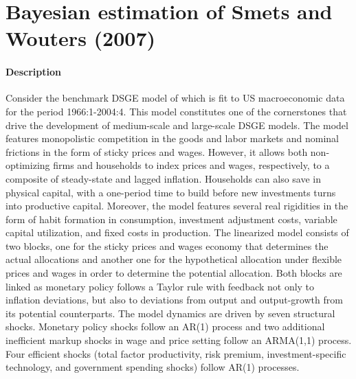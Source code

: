 \documentclass{article}
\begin{document}
\newpage 

\section[Bayesian estimation of Smets and Wouters (2007)]{Bayesian estimation of Smets and Wouters (2007)\label{ex:SW2007RWMH}}
\paragraph{Description}
Consider the benchmark DSGE model of \textcite{Smets.Wouters_2007_ShocksFrictionsUS} which is fit to US macroeconomic data for the period 1966:1-2004:4.
This model constitutes one of the cornerstones that drive the development of medium-scale and large-scale DSGE models.
The model features monopolistic competition in the goods and labor markets and nominal frictions in the form of sticky prices and wages.
However, it allows both non-optimizing firms and households to index prices and wages, respectively, to a composite of steady-state and lagged inflation.
Households can also save in physical capital, with a one-period time to build before new investments turns into productive capital.
Moreover, the model features several real rigidities in the form of habit formation in consumption, investment adjustment costs, variable capital utilization, and fixed costs in production.
The linearized model consists of two blocks, one for the sticky prices and wages economy that determines the actual allocations
  and another one for the hypothetical allocation under flexible prices and wages in order to determine the potential allocation.
Both blocks are linked as monetary policy follows a Taylor rule with feedback not only to inflation deviations,
  but also to deviations from output and output-growth from its potential counterparts.
The model dynamics are driven by seven structural shocks.
Monetary policy shocks follow an AR{(1)} process and two additional inefficient markup shocks in wage and price setting follow an ARMA{(1,1)} process.
Four efficient shocks (total factor productivity, risk premium, investment-specific technology, and government spending shocks) follow AR{(1)} processes.
\end{document}
